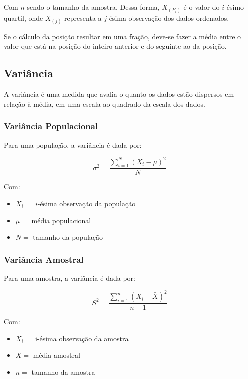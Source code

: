 \documentclass[
]{estat/estat}
\begin{document}
Com \(n\) sendo o tamanho da amostra. Dessa forma,
\(X_{\left( P_i \right)}\) é o valor do \(i\)-ésimo quartil, onde
\(X_{\left( j \right)}\) representa a \(j\)-ésima observação dos dados
ordenados.

Se o cálculo da posição resultar em uma fração, deve-se fazer a média
entre o valor que está na posição do inteiro anterior e do seguinte ao
da posição.

\subsection{Variância}\label{variuxe2ncia}

A variância é uma medida que avalia o quanto os dados estão dispersos em
relação à média, em uma escala ao quadrado da escala dos dados.

\subsubsection{Variância Populacional}\label{variuxe2ncia-populacional}

Para uma população, a variância é dada por:

\[\sigma^2=\frac{\sum\limits_{i=1}^{N}\left(X_i - \mu\right)^2}{N}\]

Com:

\begin{itemize}
\item
  \(X_i =\) \(i\)-ésima observação da população
\item
  \(\mu =\) média populacional
\item
  \(N =\) tamanho da população
\end{itemize}

\subsubsection{Variância Amostral}\label{variuxe2ncia-amostral}

Para uma amostra, a variância é dada por:

\[S^2=\frac{\sum\limits_{i=1}^{n}\left(X_i - \bar{X}\right)^2}{n-1}\]

Com:

\begin{itemize}
\item
  \(X_i =\) i-ésima observação da amostra
\item
  \(\bar{X} =\) média amostral
\item
  \(n =\) tamanho da amostra
\end{itemize}
\end{document}
